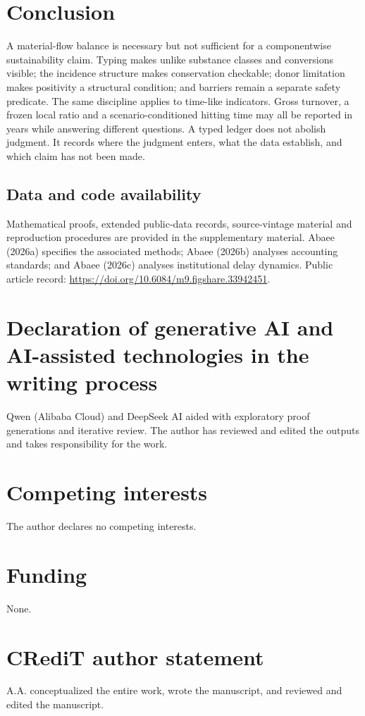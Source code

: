 \documentclass[11pt]{article}
\begin{document}
\section{Conclusion}
A material-flow balance is necessary but not sufficient for a componentwise sustainability claim. Typing makes unlike substance classes and conversions visible; the incidence structure makes conservation checkable; donor limitation makes positivity a structural condition; and barriers remain a separate safety predicate. The same discipline applies to time-like indicators. Gross turnover, a frozen local ratio and a scenario-conditioned hitting time may all be reported in years while answering different questions. A typed ledger does not abolish judgment. It records where the judgment enters, what the data establish, and which claim has not been made.
\subsection*{Data and code availability}
Mathematical proofs, extended public-data records, source-vintage material and reproduction procedures are provided in the supplementary material. Abaee (2026a) specifies the associated methods; Abaee (2026b) analyses accounting standards; and Abaee (2026c) analyses institutional delay dynamics. Public article record: \url{https://doi.org/10.6084/m9.figshare.33942451}.
\section*{Declaration of generative AI and AI-assisted technologies in the writing process}
Qwen (Alibaba Cloud) and DeepSeek AI aided with exploratory proof generations and iterative review. The author has reviewed and edited the outputs and takes responsibility for the work.
\section*{Competing interests}
The author declares no competing interests.
\section*{Funding}
None.
\section*{CRediT author statement}
A.A. conceptualized the entire work, wrote the manuscript, and reviewed and edited the manuscript.
\end{document}
